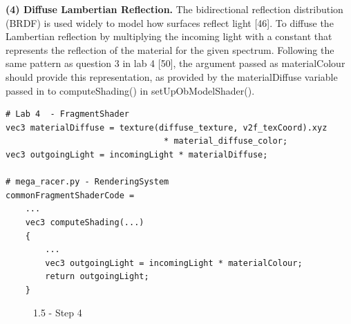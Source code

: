 \documentclass[a4 paper, 12pt]{article}
\begin{document}
\textbf{(4) Diffuse Lambertian Reflection.}
The bidirectional reflection distribution (BRDF) is used widely to model how surfaces reflect light [46]. To diffuse the Lambertian reflection by multiplying the incoming light with a constant that represents the reflection of the material for the given spectrum. Following the same pattern as question 3 in lab 4 [50], the argument passed as materialColour should provide this representation, as provided by the materialDiffuse variable passed in to computeShading() in setUpObModelShader(). 
    \begin{lstlisting} 
# Lab 4  - FragmentShader
vec3 materialDiffuse = texture(diffuse_texture, v2f_texCoord).xyz 
                                * material_diffuse_color;
vec3 outgoingLight = incomingLight * materialDiffuse;

# mega_racer.py - RenderingSystem
commonFragmentShaderCode =
    ...
    vec3 computeShading(...)
    {
        ...
        vec3 outgoingLight = incomingLight * materialColour;
        return outgoingLight;
    }                            
    \end{lstlisting}

    \begin{figure} [H]
        \caption{1.5 - Step 4}   
    \end{figure}
\end{document}
